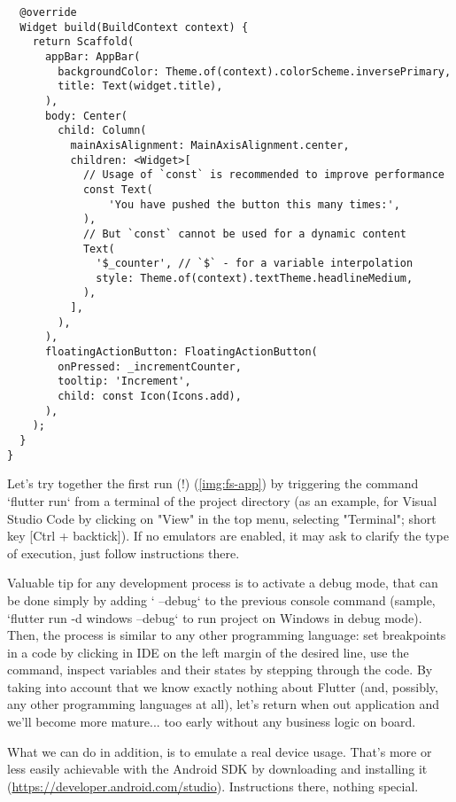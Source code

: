\begin{lstlisting}
  @override
  Widget build(BuildContext context) {
    return Scaffold(
      appBar: AppBar(
        backgroundColor: Theme.of(context).colorScheme.inversePrimary,
        title: Text(widget.title),
      ),
      body: Center(
        child: Column(
          mainAxisAlignment: MainAxisAlignment.center,
          children: <Widget>[
            // Usage of `const` is recommended to improve performance
            const Text(
                'You have pushed the button this many times:',
            ),
            // But `const` cannot be used for a dynamic content
            Text(
              '$_counter', // `$` - for a variable interpolation
              style: Theme.of(context).textTheme.headlineMedium,
            ),
          ],
        ),
      ),
      floatingActionButton: FloatingActionButton(
        onPressed: _incrementCounter,
        tooltip: 'Increment',
        child: const Icon(Icons.add),
      ),
    );
  }
}
\end{lstlisting}

Let's try together the first run (!) (\cref{img:fs-app}) by triggering the command `flutter run` from a terminal of the 
project directory (as an example, for Visual Studio Code by clicking on "View" in the top menu, selecting "Terminal"; 
short key [Ctrl + backtick]). If no emulators are enabled, it may ask to clarify the type of execution, just follow 
instructions there.

Valuable tip for any development process is to activate a debug mode, that can be done simply by adding ` --debug` to 
the previous console command (sample, `flutter run -d windows --debug` to run project on Windows in debug mode). Then, 
the process is similar to any other programming language: set breakpoints in a code by clicking in IDE on the left 
margin of the desired line, use the command, inspect variables and their states by stepping through the code. 
By taking into account that we know exactly nothing about Flutter (and, possibly, any other programming languages 
at all), let's return when out application and we'll become more mature... too early without any business logic on board.


What we can do in addition, is to emulate a real device usage. That's more or less easily achievable with the 
Android SDK by downloading and installing it 
(\href{https://developer.android.com/studio}{https://developer.android.com/studio}). Instructions there, nothing special.

